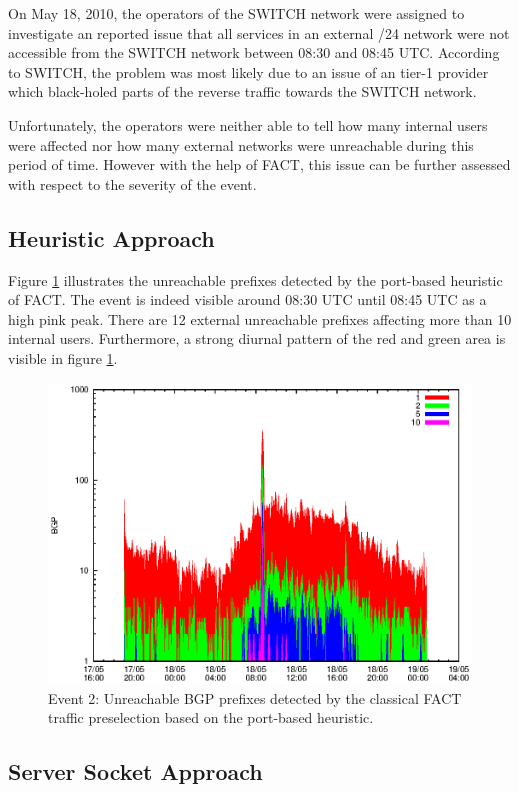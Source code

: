On May 18, 2010, the operators of the SWITCH network were assigned to 
investigate an reported issue that all services in an external /24 network were 
not accessible from the SWITCH network between 08:30 and 08:45 UTC. According to 
SWITCH, the problem was most likely due to an issue of an tier-1 provider which 
black-holed parts of the reverse traffic towards the SWITCH 
network\citep{SchatzmannPAM2011}.

Unfortunately, the operators were neither able to tell how many internal users 
were affected nor how many external networks were unreachable during this period 
of time. However with the help of FACT, this issue can be further assessed with 
respect to the severity of the event\citep{SchatzmannPAM2011}.

\subsection{Heuristic Approach}

Figure \ref{fig:TIER1_FACT_REF} illustrates the unreachable prefixes detected by the port-based heuristic of FACT. The event is indeed visible around 08:30 UTC until 08:45 UTC as a high pink peak. There are 12 external unreachable prefixes affecting more than 10 internal users. Furthermore, a strong diurnal pattern of the red and green area is visible in figure \ref{fig:TIER1_FACT_REF}.

\begin{figure}
	[p] \centering 
	\includegraphics[width=0.75\linewidth]{images/events/2010_05_18/bgp_log_port80_ref.eps}
	\caption{Event 2: Unreachable BGP prefixes detected by the classical FACT traffic preselection based on the port-based heuristic.} 
	\label{fig:TIER1_FACT_REF} 
\end{figure}


\subsection{Server Socket Approach}

